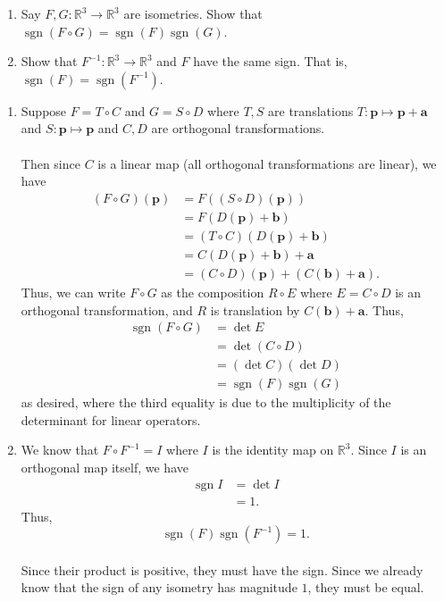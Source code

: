 \documentclass[12 pt, letterpaper]{hmcpset}
\begin{document}
\begin{problem}[Problem 1.]
	\begin{enumerate}
		 \item Say $F, G : \mathbb{R}^{3} \to \mathbb{R}^{3}$ are isometries. Show that $\operatorname{sgn}(F \circ G) = \operatorname{sgn}(F) \operatorname{sgn}(G)$.
		\item Show that $F^{-1} : \mathbb{R}^{3} \to \mathbb{R}^{3}$ and $F$ have the same sign. That is, $\operatorname{sgn}(F) = \operatorname{sgn}(F^{-1})$.
	\end{enumerate}
\end{problem}

\begin{solution}
	\begin{enumerate}
		\item Suppose $F = T \circ C$ and $G = S \circ D$ where $T, S$ are translations $T : \mathbf{p} \mapsto \mathbf{p} + \mathbf{a}$ and $S : \mathbf{p} \mapsto \mathbf{p}$ and $C, D$ are orthogonal transformations. \\\\
			Then since $C$ is a linear map (all orthogonal transformations are linear), we have
			\[
				\begin{split}
					(F \circ G) (\mathbf{p}) & = F((S \circ D)(\mathbf{p})) \\
								 & = F(D(\mathbf{p}) + \mathbf{b}) \\
								 & = (T \circ C)(D(\mathbf{p}) + \mathbf{b}) \\
								 & = C(D(\mathbf{p}) + \mathbf{b}) + \mathbf{a} \\
								 & = (C \circ D)(\mathbf{p}) + (C(\mathbf{b}) + \mathbf{a}).
				\end{split}
			\]
			Thus, we can write $F \circ G$ as the composition $R \circ E$ where $E = C \circ D$ is an orthogonal transformation, and $R$ is translation by $C(\mathbf{b}) + \mathbf{a}$. Thus,
			\[
				\begin{split}
					\operatorname{sgn}(F \circ G) & = \det E \\
								      & = \det (C \circ D) \\
								      & = (\det C) (\det D) \\
								      & = \operatorname{sgn} (F) \operatorname{sgn} (G)
				\end{split}
			\]
			as desired, where the third equality is due to the multiplicity of the determinant for linear operators.
		\item We know that $F \circ F^{-1} = I$ where $I$ is the identity map on $\mathbb{R}^{3}$. Since $I$ is an orthogonal map itself, we have
			\[
				\begin{split}
					\operatorname{sgn} I & = \det I \\
							     & = 1.
				\end{split}
			\]
			Thus,
			\[
				\operatorname{sgn}(F) \operatorname{sgn}(F^{-1}) = 1.
			\] \\
			Since their product is positive, they must have the sign. Since we already know that the sign of any isometry has magnitude $1$, they must be equal.
	\end{enumerate}
\end{solution}
\end{document}
